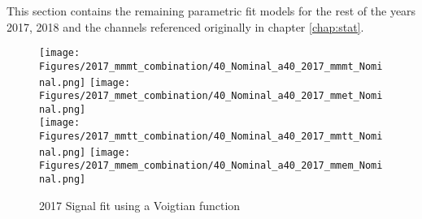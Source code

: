 This section contains the remaining parametric fit models for the rest of the years 2017, 2018 and the channels referenced originally in chapter \ref{chap:stat}.

\begin{figure}[ht!b]
  \centering
  \texttt{[image: Figures/2017\_mmmt\_combination/40\_Nominal\_a40\_2017\_mmmt\_Nominal.png]}
  \texttt{[image: Figures/2017\_mmet\_combination/40\_Nominal\_a40\_2017\_mmet\_Nominal.png]}\\
  \texttt{[image: Figures/2017\_mmtt\_combination/40\_Nominal\_a40\_2017\_mmtt\_Nominal.png]}
  \texttt{[image: Figures/2017\_mmem\_combination/40\_Nominal\_a40\_2017\_mmem\_Nominal.png]}\\
    \caption{\label{fig:2017_fit_sig} 2017 Signal fit using a Voigtian function}
\end{figure}

